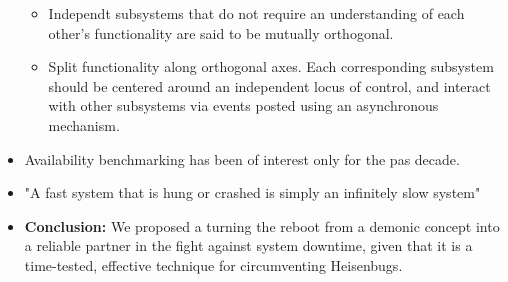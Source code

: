 \begin{itemize}
\begin{itemize}
		\item Independt subsystems that do not require an understanding of each other's functionality are said to be mutually orthogonal.
		\item Split functionality along orthogonal axes. Each corresponding subsystem should be centered around an independent locus of control, and interact with other subsystems via events posted using an asynchronous mechanism.
	\end{itemize}
	\item Availability benchmarking has been of interest only for the pas decade.
	\item "A fast system that is hung or crashed is simply an infinitely slow system"
	\item \textbf{Conclusion: } We proposed a turning the reboot from a demonic concept into a reliable partner in the fight against system downtime, given that it is a time-tested, effective technique for circumventing Heisenbugs.

\end{itemize}
